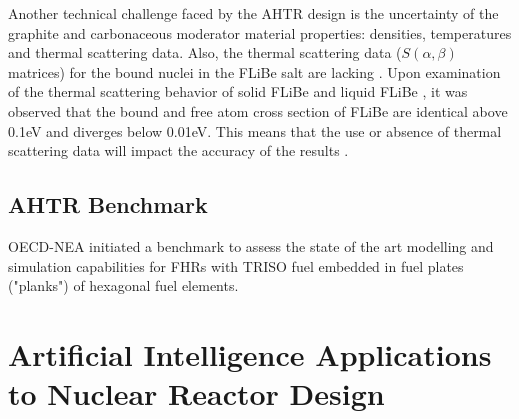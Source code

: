 Another technical challenge faced by the \gls{AHTR} design is the uncertainty of 
the graphite and carbonaceous moderator material properties: densities, temperatures
and thermal scattering data.
Also, the thermal scattering data ($S(\alpha,\beta)$ matrices) for the bound 
nuclei in the \gls{FLiBe} salt are lacking \cite{ramey_monte_2018}. 
Upon examination of the thermal scattering behavior of solid \gls{FLiBe}
\cite{mei_investigation_2013} and liquid \gls{FLiBe} \cite{zhu_thermal_2017}, 
it was observed that the bound and free atom cross section of \gls{FLiBe} are 
identical above 0.1eV and diverges below 0.01eV. 
This means that the use or absence of thermal scattering data will impact the 
accuracy of the results \cite{ramey_monte_2018}. 

\subsection{AHTR Benchmark}
OECD-NEA initiated a benchmark to assess the state of the art modelling and 
simulation capabilities for \glspl{FHR} with \gls{TRISO} fuel embedded in fuel 
plates ("planks") of hexagonal fuel elements. 

\section{Artificial Intelligence Applications to Nuclear Reactor Design}
